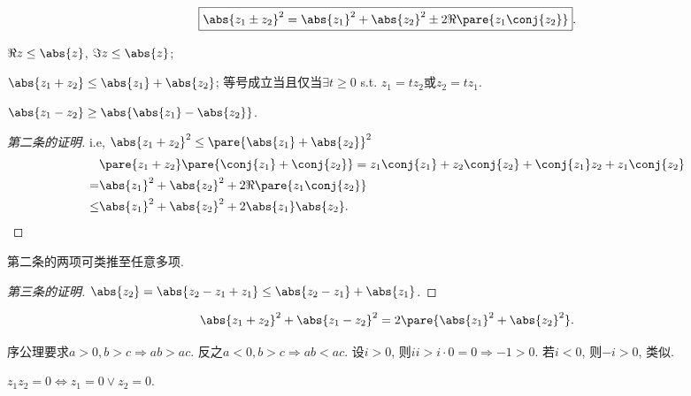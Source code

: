 \documentclass[../ComplexVariable.tex]{subfiles}
\begin{document}
\begin{equation}
    \label{eq:复数平方和展开}
    \boxed{\abs{z_1\pm z_2}^2 = \abs{z_1}^2 + \abs{z_2}^2 \pm 2\Re\pare{z_1\conj{z_2}}}.
\end{equation}
\begin{proposition}[模的不等式]\leavevmode
    \label{prop:模的不等式}
    \begin{cenum}
        \item $\Re z \le \abs{z}$, $\Im z \le \abs{z}$;
        \item $\abs{z_1+z_2} \le \abs{z_1} + \abs{z_2}$; 等号成立当且仅当$\exists t\ge 0$ s.t. $z_1 = tz_2$或$z_2 = tz_1$.
        \item $\abs{z_1-z_2} \ge \abs{\abs{z_1} - \abs{z_2}}$.
    \end{cenum}
\end{proposition}
\begin{proof}[第二条的证明]
    i.e, $\abs{z_1+z_2}^2 \le \pare{\abs{z_1}+\abs{z_2}}^2$
    \begin{align*}
         &\pare{z_1+z_2}\pare{\conj{z_1}+\conj{z_2}} = z_1\conj{z_1} + z_2\conj{z_2} + \conj{z_1}z_2 + z_1\conj{z_2}\\
          =& \abs{z_1}^2 + \abs{z_2}^2 + 2\Re\pare{z_1\conj{z_2}} \\
          \le& \abs{z_1}^2 + \abs{z_2}^2 + 2\abs{z_1}\abs{z_2}. \qedhere
    \end{align*}
\end{proof}
\begin{remark}
    第二条的两项可类推至任意多项.
\end{remark}
\begin{proof}[第三条的证明]
    $\abs{z_2} = \abs{z_2-z_1+z_1} \le \abs{z_2-z_1} + \abs{z_1}$.
\end{proof}
\begin{corollary}
    \begin{equation}
        \label{eq:平行四边形恒等式}
        \abs{z_1+z_2}^2 + \abs{z_1-z_2}^2 = 2\pare{\abs{z_1}^2 + \abs{z_2}^2}. 
    \end{equation}
\end{corollary}
\begin{sample}
    \begin{ex}[$\+bC$上无法定义全序]
        序公理要求$a>0, b>c \Rightarrow ab>ac$. 反之$a<0, b>c\Rightarrow ab<ac$. 设$i>0$, 则$ii > i\cdot 0 = 0 \Rightarrow -1 > 0$. 若$i<0$, 则$-i>0$, 类似.
    \end{ex}
\end{sample}
\begin{sample}
    \begin{ex}
        $z_1z_2 = 0\Leftrightarrow z_1=0\lor z_2 = 0$.
    \end{ex}
\end{sample}
\end{document}
